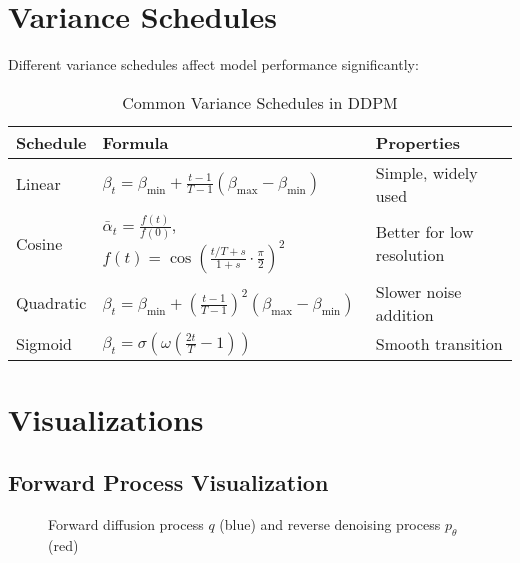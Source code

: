 \documentclass[11pt,a4paper]{article}
\theoremstyle{definition}
\begin{document}
\section{Variance Schedules}

Different variance schedules affect model performance significantly:

\begin{table}[H]
\centering
\caption{Common Variance Schedules in DDPM}
\label{tab:schedules}
\begin{tabular}{@{}lll@{}}
\toprule
\textbf{Schedule} & \textbf{Formula} & \textbf{Properties} \\
\midrule
Linear & $\beta_t = \beta_{\min} + \frac{t-1}{T-1}(\beta_{\max} - \beta_{\min})$ & Simple, widely used \\
Cosine & $\bar{\alpha}_t = \frac{f(t)}{f(0)}$, $f(t) = \cos\left(\frac{t/T + s}{1 + s} \cdot \frac{\pi}{2}\right)^2$ & Better for low resolution \\
Quadratic & $\beta_t = \beta_{\min} + \left(\frac{t-1}{T-1}\right)^2(\beta_{\max} - \beta_{\min})$ & Slower noise addition \\
Sigmoid & $\beta_t = \sigma\left(\omega\left(\frac{2t}{T} - 1\right)\right)$ & Smooth transition \\
\bottomrule
\end{tabular}
\end{table}

\section{Visualizations}

\subsection{Forward Process Visualization}

\begin{figure}[H]
\centering
{}
\caption{Forward diffusion process $q$ (blue) and reverse denoising process $p_\theta$ (red)}
\label{fig:diffusion_process}
\end{figure}
\end{document}
